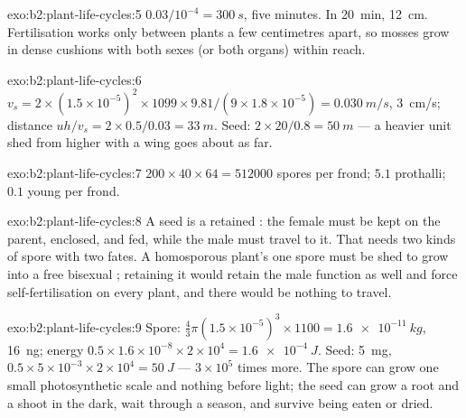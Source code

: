 \begin{solution}{exo:b2:plant-life-cycles:5}
$0.03/10^{-4} = \qty{300}{s}$, five minutes. In \qty{20}{min},
\qty{12}{cm}. Fertilisation works only between plants a few
centimetres apart, so mosses grow in dense cushions with both sexes
(or both organs) within reach.
\end{solution}

\begin{solution}{exo:b2:plant-life-cycles:6}
$v_s = 2\times(1.5\times 10^{-5})^2\times 1099\times 9.81/(9\times
1.8\times 10^{-5}) = \qty{0.030}{m/s}$, \qty{3}{cm/s}; distance $uh/v_s
= 2\times 0.5/0.03 = \qty{33}{m}$. Seed: $2\times 20/0.8 =
\qty{50}{m}$ --- a heavier unit shed from higher with a wing goes
about as far.
\end{solution}

\begin{solution}{exo:b2:plant-life-cycles:7}
$200\times 40\times 64 = \num{512000}$ spores per frond; $5.1$
prothalli; $0.1$ young  per frond.
\end{solution}

\begin{solution}{exo:b2:plant-life-cycles:8}
A seed is a retained : the female  must be kept on
the parent, enclosed, and fed, while the male  must
travel to it. That needs two kinds of spore with two fates. A
homosporous plant's one spore must be shed to grow into a free
bisexual ; retaining it would retain the male function as
well and force self-fertilisation on every plant, and there would be
nothing to travel.
\end{solution}

\begin{solution}{exo:b2:plant-life-cycles:9}
Spore: $\tfrac43\pi(1.5\times 10^{-5})^3\times 1100 =
\qty{1.6e-11}{kg}$, \qty{16}{ng}; energy $0.5\times 1.6\times
10^{-8}\times 2\times 10^{4} = \qty{1.6e-4}{J}$. Seed: \qty{5}{mg},
$0.5\times 5\times 10^{-3}\times 2\times 10^{4} = \qty{50}{J}$ ---
$3\times 10^{5}$ times more. The spore can grow one small
photosynthetic scale and nothing before light; the seed can grow a
root and a shoot in the dark, wait through a season, and survive
being eaten or dried.
\end{solution}


